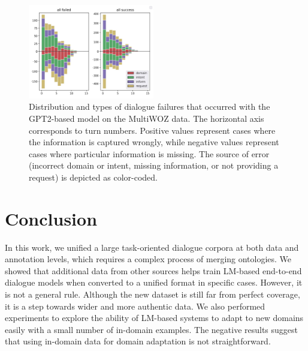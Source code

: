 \begin{figure}[tp]
    \centering  \small
    \includegraphics[width=0.49\textwidth]{images/hist-vert-True-gpt.jpg}
    \caption{Distribution and types of dialogue failures that occurred with the GPT2-based model on the MultiWOZ data.
    The horizontal axis corresponds to turn numbers. Positive values represent cases where the information is captured wrongly, while negative values represent cases where particular information is missing.
    The source of error (incorrect domain or intent, missing information, or not providing a request) is depicted as color-coded.}
    \label{fig:error_distr}
\end{figure}



\section{Conclusion}
In this work, we unified a large task-oriented dialogue corpora at both data and annotation levels, which requires a complex process of merging ontologies. 
We showed that additional data from other sources helps train LM-based end-to-end dialogue models when converted to a unified format in specific cases.
However, it is not a general rule.
Although the new dataset is still far from perfect coverage, it is a step towards wider and more authentic data.
We also performed experiments to explore the ability of LM-based systems to adapt to new domains easily with a small number of in-domain examples.
The negative results suggest that using in-domain data for domain adaptation is not straightforward.